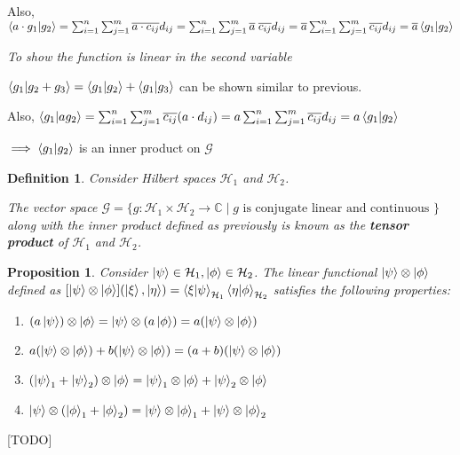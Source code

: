 \documentclass[12pt,twoside,fleqn]{report}
\makeatletter
\theoremstyle{thmstyle}
\renewenvironment{proof}[1][\proofname]{\par
\pushQED{\qed}%
\normalfont \topsep6\p@\@plus6\p@\relax
\trivlist
\item[\hskip\labelsep\itshape#1\@addpunct{.}]\mbox{}\par\nobreak\ignorespaces
}{%
    \popQED\endtrivlist\@endpefalse
    }
\newtheorem{defn}{Definition}[chapter]
\newtheorem{prop}{Proposition}[chapter]
\makeatother
\begin{document}
\begin{proof}
    Also, $\braket{a \cdot g_1 | g_2} = \sum_{i=1}^n \sum_{j=1}^m \overline{a \cdot c_{ij}} d_{ij} = \sum_{i=1}^n \sum_{j=1}^m \overline{a} \; \overline{c_{ij}} d_{ij} = \overline{a}  \sum_{i=1}^n \sum_{j=1}^m \overline{c_{ij}} d_{ij} = \overline{a} \braket{g_1|g_2}$

    \emph{To show the function is linear in the second variable}

    $\braket{g_1| g_2 + g_3} = \braket{g_1|g_2} + \braket{g_1|g_3}$ can be shown similar to previous.

    Also, $\braket{ g_1 | a g_2} = \sum_{i=1}^n \sum_{j=1}^m \overline{c_{ij}} (a \cdot d_{ij}) = a \sum_{i=1}^n \sum_{j=1}^m \overline{c_{ij}} d_{ij} = a \braket{g_1|g_2}$

    $\implies \braket{g_1|g_2}$ is an inner product on $\mathcal{G}$
\end{proof}

\begin{defn}
    Consider Hilbert spaces $\mathcal{H}_1$ and $\mathcal{H}_2$.

    The vector space $\mathcal{G} =  \{ g: \mathcal{H}_1 \times \mathcal{H}_2 \to \mathbb{C} \; | \; g \text{ is conjugate linear and continuous } \}$  along with the inner product defined as previously is known as the \textbf{tensor product} of $\mathcal{H}_1$ and $\mathcal{H}_2$.
\end{defn}

\begin{prop}
    Consider $\ket\psi \in \mathcal{H}_1, \ket\phi \in \mathcal{H}_2$.
    The linear functional $\ket{\psi} \otimes \ket{\phi}$ defined as $[\ket\psi \otimes \ket\phi](\ket\xi,\ket\eta) = \braket{\xi|\psi}_{\mathcal{H}_1}\braket{\eta|\phi}_{\mathcal{H}_2}$  satisfies the following properties:
    \begin{enumerate}
        \item $(a \ket\psi) \otimes \ket\phi = \ket\psi \otimes (a \ket\phi) = a (\ket\psi \otimes \ket\phi)$
        \item $a (\ket\psi \otimes \ket\phi) + b (\ket\psi \otimes \ket\phi) = (a + b) (\ket\psi \otimes \ket\phi)$
        \item $(\ket\psi_1 + \ket\psi_2) \otimes \ket\phi = \ket\psi_1 \otimes \ket\phi + \ket\psi_2 \otimes \ket\phi$
        \item $\ket\psi \otimes (\ket\phi_1 + \ket\phi_2) = \ket\psi \otimes \ket\phi_1 + \ket\psi \otimes \ket\phi_2$
    \end{enumerate}
\end{prop}
\begin{proof}
    [TODO]
\end{proof}
\end{document}

